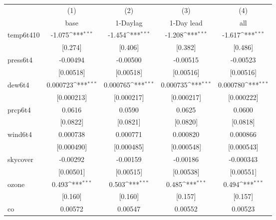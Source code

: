 {
\def\sym#1{\ifmmode^{#1}\else\(^{#1}\)\fi}
\begin{tabular}{l*{4}{c}}
\hline\hline
            &\multicolumn{1}{c}{(1)}&\multicolumn{1}{c}{(2)}&\multicolumn{1}{c}{(3)}&\multicolumn{1}{c}{(4)}\\
            &\multicolumn{1}{c}{base}&\multicolumn{1}{c}{1-Daylag}&\multicolumn{1}{c}{1-Day lead}&\multicolumn{1}{c}{all}\\
\hline
temp6t410   &      -1.075\sym{***}&      -1.454\sym{***}&      -1.208\sym{***}&      -1.617\sym{***}\\
            &     [0.274]         &     [0.406]         &     [0.382]         &     [0.486]         \\
[1em]
press6t4    &    -0.00494         &    -0.00500         &    -0.00515         &    -0.00523         \\
            &   [0.00518]         &   [0.00518]         &   [0.00516]         &   [0.00516]         \\
[1em]
dew6t4      &    0.000723\sym{***}&    0.000765\sym{***}&    0.000735\sym{***}&    0.000780\sym{***}\\
            &  [0.000213]         &  [0.000217]         &  [0.000217]         &  [0.000222]         \\
[1em]
prcp6t4     &      0.0616         &      0.0590         &      0.0625         &      0.0600         \\
            &    [0.0822]         &    [0.0821]         &    [0.0820]         &    [0.0818]         \\
[1em]
wind6t4     &    0.000738         &    0.000771         &    0.000820         &    0.000866         \\
            &  [0.000490]         &  [0.000485]         &  [0.000548]         &  [0.000543]         \\
[1em]
skycover    &    -0.00292         &    -0.00159         &    -0.00186         &   -0.000343         \\
            &   [0.00501]         &   [0.00515]         &   [0.00538]         &   [0.00551]         \\
[1em]
ozone       &       0.493\sym{***}&       0.503\sym{***}&       0.485\sym{***}&       0.494\sym{***}\\
            &     [0.160]         &     [0.160]         &     [0.157]         &     [0.157]         \\
[1em]
co          &     0.00572         &     0.00547         &     0.00552         &     0.00523         \\

\end{tabular}}
